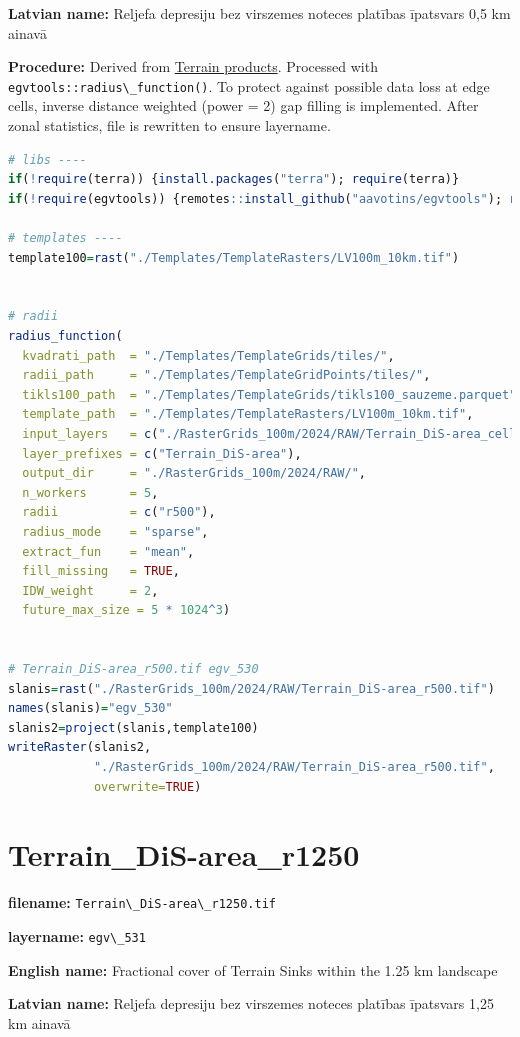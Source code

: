 \documentclass[
]{book}
\newcommand{\passthrough}[1]{#1}
\begin{document}
\textbf{Latvian name:} Reljefa depresiju bez virszemes noteces platības īpatsvars 0,5 km ainavā

\textbf{Procedure:} Derived from \hyperref[Ch05.01]{Terrain products}. Processed
with \passthrough{\lstinline!egvtools::radius\_function()!}. To protect against
possible data loss at edge cells, inverse distance weighted (power = 2) gap filling
is implemented. After zonal statistics, file is rewritten to ensure layername.

\begin{lstlisting}[language=R]
# libs ----
if(!require(terra)) {install.packages("terra"); require(terra)}
if(!require(egvtools)) {remotes::install_github("aavotins/egvtools"); require(egvtools)}

# templates ----
template100=rast("./Templates/TemplateRasters/LV100m_10km.tif")


# radii
radius_function(
  kvadrati_path  = "./Templates/TemplateGrids/tiles/",
  radii_path     = "./Templates/TemplateGridPoints/tiles/",
  tikls100_path  = "./Templates/TemplateGrids/tikls100_sauzeme.parquet",
  template_path  = "./Templates/TemplateRasters/LV100m_10km.tif",
  input_layers   = c("./RasterGrids_100m/2024/RAW/Terrain_DiS-area_cell.tif"),
  layer_prefixes = c("Terrain_DiS-area"),
  output_dir     = "./RasterGrids_100m/2024/RAW/",
  n_workers      = 5,
  radii          = c("r500"),
  radius_mode    = "sparse",
  extract_fun    = "mean",
  fill_missing   = TRUE,
  IDW_weight     = 2,
  future_max_size = 5 * 1024^3)


# Terrain_DiS-area_r500.tif egv_530
slanis=rast("./RasterGrids_100m/2024/RAW/Terrain_DiS-area_r500.tif")
names(slanis)="egv_530"
slanis2=project(slanis,template100)
writeRaster(slanis2,
            "./RasterGrids_100m/2024/RAW/Terrain_DiS-area_r500.tif",
            overwrite=TRUE)
\end{lstlisting}

\section{Terrain\_DiS-area\_r1250}\label{ch06.531}

\textbf{filename:} \passthrough{\lstinline!Terrain\_DiS-area\_r1250.tif!}

\textbf{layername:} \passthrough{\lstinline!egv\_531!}

\textbf{English name:} Fractional cover of Terrain Sinks within the 1.25 km landscape

\textbf{Latvian name:} Reljefa depresiju bez virszemes noteces platības īpatsvars 1,25 km ainavā
\end{document}
